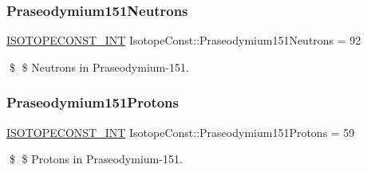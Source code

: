 \subsubsection{\texorpdfstring{Praseodymium151\+Neutrons}{Praseodymium151Neutrons}}
{\footnotesize\ttfamily \mbox{\hyperlink{group___isotope_const-_macros_ga5f18360b3e99483a35c32d789e62621c}{I\+S\+O\+T\+O\+P\+E\+C\+O\+N\+S\+T\+\_\+\+I\+NT}} Isotope\+Const\+::\+Praseodymium151\+Neutrons = 92}

\$ \$ Neutrons in Praseodymium-\/151. \mbox{\label{group___isotope_const-_praseodymium-_pr151_gaa783c6fcd48832c09ac01a8f90f768ad}} 
\subsubsection{\texorpdfstring{Praseodymium151\+Protons}{Praseodymium151Protons}}
{\footnotesize\ttfamily \mbox{\hyperlink{group___isotope_const-_macros_ga5f18360b3e99483a35c32d789e62621c}{I\+S\+O\+T\+O\+P\+E\+C\+O\+N\+S\+T\+\_\+\+I\+NT}} Isotope\+Const\+::\+Praseodymium151\+Protons = 59}

\$ \$ Protons in Praseodymium-\/151. 